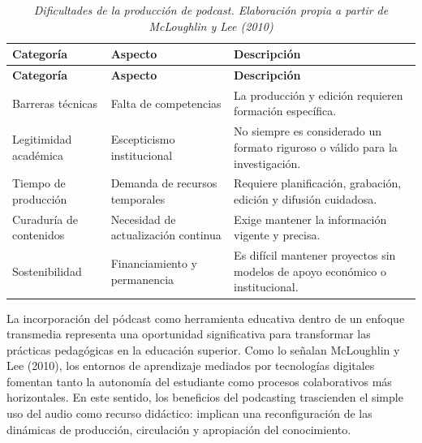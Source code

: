 \documentclass[
]{interact}
\begin{document}
\begin{longtable}[]{@{}
  >{\raggedright\arraybackslash}p{}
  >{\raggedright\arraybackslash}p{}
  >{\raggedright\arraybackslash}p{}@{}}
\caption{\emph{Dificultades de la producción de podcast. Elaboración
propia a partir de McLoughlin y Lee (2010)}}\tabularnewline
\toprule\noalign{}
\begin{minipage}[b]{\linewidth}\raggedright
\textbf{Categoría}
\end{minipage} & \begin{minipage}[b]{\linewidth}\raggedright
\textbf{Aspecto}
\end{minipage} & \begin{minipage}[b]{\linewidth}\raggedright
\textbf{Descripción}
\end{minipage} \\
\midrule\noalign{}
\endfirsthead
\toprule\noalign{}
\begin{minipage}[b]{\linewidth}\raggedright
\textbf{Categoría}
\end{minipage} & \begin{minipage}[b]{\linewidth}\raggedright
\textbf{Aspecto}
\end{minipage} & \begin{minipage}[b]{\linewidth}\raggedright
\textbf{Descripción}
\end{minipage} \\
\midrule\noalign{}
\endhead
\bottomrule\noalign{}
\endlastfoot
Barreras técnicas & Falta de competencias & La producción y edición
requieren formación específica. \\
Legitimidad académica & Escepticismo institucional & No siempre es
considerado un formato riguroso o válido para la investigación. \\
Tiempo de producción & Demanda de recursos temporales & Requiere
planificación, grabación, edición y difusión cuidadosa. \\
Curaduría de contenidos & Necesidad de actualización continua & Exige
mantener la información vigente y precisa. \\
Sostenibilidad & Financiamiento y permanencia & Es difícil mantener
proyectos sin modelos de apoyo económico o institucional. \\
\end{longtable}

\newpage

La incorporación del pódcast como herramienta educativa dentro de un
enfoque transmedia representa una oportunidad significativa para
transformar las prácticas pedagógicas en la educación superior. Como lo
señalan McLoughlin y Lee (2010), los entornos de aprendizaje mediados
por tecnologías digitales fomentan tanto la autonomía del estudiante
como procesos colaborativos más horizontales. En este sentido, los
beneficios del podcasting trascienden el simple uso del audio como
recurso didáctico: implican una reconfiguración de las dinámicas de
producción, circulación y apropiación del conocimiento.
\end{document}
